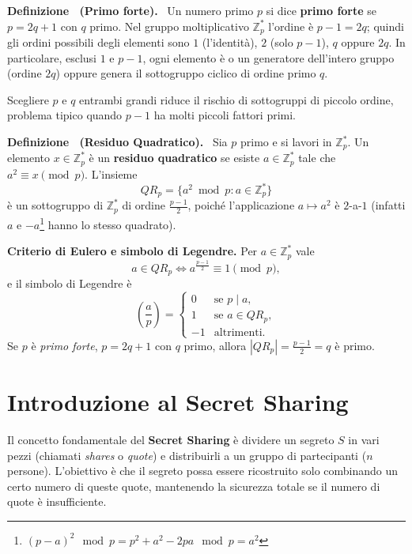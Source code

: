 \documentclass[a4paper, 11pt]{article}
\newenvironment{definition}[1][]{
  \par\noindent\textbf{Definizione%
  \if\relax\detokenize{#1}\relax\else\ (\textbf{#1})\fi.}\ }{}
\begin{document}
\begin{definition}[Primo forte]
    Un numero primo $p$ si dice \textbf{primo forte} se $p = 2q + 1$ con $q$ primo. Nel gruppo moltiplicativo $\mathbb{Z}_p^*$ l'ordine è $p-1 = 2q$; quindi gli ordini possibili degli elementi sono $1$ (l'identità), $2$ (solo $p-1$), $q$ oppure $2q$. In particolare, esclusi $1$ e $p-1$, ogni elemento è o un generatore dell'intero gruppo (ordine $2q$) oppure genera il sottogruppo ciclico di ordine primo $q$.
    
    Scegliere $p$ e $q$ entrambi grandi riduce il rischio di sottogruppi di piccolo ordine, problema tipico quando $p-1$ ha molti piccoli fattori primi.
\end{definition}
\begin{definition}[Residuo Quadratico]
    Sia $p$ primo e si lavori in $\mathbb{Z}_p^*$. Un elemento $x \in \mathbb{Z}_p^*$ è un \textbf{residuo quadratico} se esiste $a \in \mathbb{Z}_p^*$ tale che $a^2 \equiv x \pmod p$. L’insieme
    \[
        QR_p=\{a^2 \bmod p : a\in\mathbb{Z}_p^*\}
    \]
    è un sottogruppo di $\mathbb{Z}_p^*$ di ordine $\frac{p-1}{2}$, poiché l’applicazione $a \mapsto a^2$ è $2$-a-$1$ (infatti $a$ e $-a$\footnote{$(p-a)^2 \mod p = p^2 + a^2 - 2pa \mod p = a^2$} hanno lo stesso quadrato).

    \textbf{Criterio di Eulero e simbolo di Legendre.} Per $a\in\mathbb{Z}_p^*$ vale
    \[
        a \in QR_p \iff a^{\frac{p-1}{2}} \equiv 1 \pmod p,
    \]
    e il simbolo di Legendre è
    \[
        \left(\frac{a}{p}\right)=
        \begin{cases}
            0 & \text{se } p \mid a,\\
            1 & \text{se } a \in QR_p,\\
            -1 & \text{altrimenti.}
        \end{cases}
    \]
    Se $p$ è \emph{primo forte}, $p=2q+1$ con $q$ primo, allora $|QR_p|=\frac{p-1}{2}=q$ è primo.
\end{definition}

\newpage

\section{Introduzione al Secret Sharing}

Il concetto fondamentale del \textbf{Secret Sharing} è dividere un segreto $S$ in vari pezzi (chiamati \textit{shares} o \textit{quote}) e distribuirli a un gruppo di partecipanti ($n$ persone). L'obiettivo è che il segreto possa essere ricostruito solo combinando un certo numero di queste quote, mantenendo la sicurezza totale se il numero di quote è insufficiente.
\end{document}
